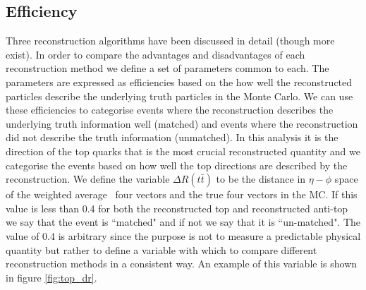 \subsection{Efficiency}
Three reconstruction algorithms have been discussed in detail (though more exist). In order to compare the advantages and disadvantages of each reconstruction method we define a set of parameters common to each. The parameters are expressed as efficiencies based on the how well the reconstructed particles describe the underlying truth particles in the Monte Carlo. We can use these efficiencies to categorise events where the reconstruction describes the underlying truth information well (matched) and events where the reconstruction did not describe the truth information (unmatched). In this analysis it is the direction of the top quarks that is the most crucial reconstructed quantity and we categorise the events based on how well the top directions are described by the reconstruction. We define the variable $\Delta R (t\bar{t})$ to be the distance in $\eta - \phi$ space of the weighted average \ttbar\ four vectors and the true four vectors in the MC. If this value is less than 0.4 for both the reconstructed top and reconstructed anti-top we say that the event is ``matched" and if not we say that it is ``un-matched". The value of 0.4 is arbitrary since the purpose is not to measure a predictable physical quantity but rather to define a variable with which to compare different reconstruction methods in a consistent way. An example of this variable is shown in figure \ref{fig:top_dr}.



